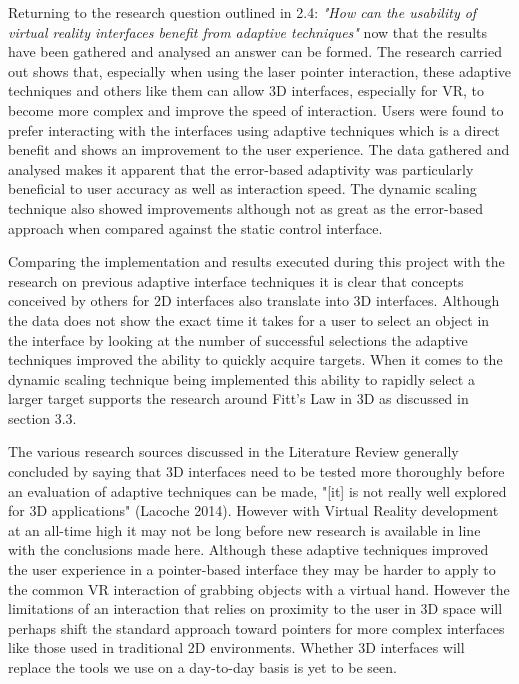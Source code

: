 \documentclass[12pt]{article}
\begin{document}
Returning to the research question outlined in 2.4: \emph{"How can the usability of virtual reality interfaces benefit from adaptive techniques"} now that the results have been gathered and analysed an answer can be formed. The research carried out shows that, especially when using the laser pointer interaction, these adaptive techniques and others like them can allow 3D interfaces, especially for VR, to become more complex and improve the speed of interaction. Users were found to prefer interacting with the interfaces using adaptive techniques which is a direct benefit and shows an improvement to the user experience. The data gathered and analysed makes it apparent that the error-based adaptivity was particularly beneficial to user accuracy as well as interaction speed. The dynamic scaling technique also showed improvements although not as great as the error-based approach when compared against the static control interface.

Comparing the implementation and results executed during this project with the research on previous adaptive interface techniques it is clear that concepts conceived by others for 2D interfaces also translate into 3D interfaces. Although the data does not show the exact time it takes for a user to select an object in the interface by looking at the number of successful selections the adaptive techniques improved the ability to quickly acquire targets. When it comes to the dynamic scaling technique being implemented this ability to rapidly select a larger target supports the research around Fitt's Law in 3D as discussed in section 3.3.

The various research sources discussed in the Literature Review generally concluded by saying that 3D interfaces need to be tested more thoroughly before an evaluation of adaptive techniques can be made, "[it] is not really well explored for 3D applications" (Lacoche 2014). However with Virtual Reality development at an all-time high it may not be long before new research is available in line with the conclusions made here. Although these adaptive techniques improved the user experience in a pointer-based interface they may be harder to apply to the common VR interaction of grabbing objects with a virtual hand. However the limitations of an interaction that relies on proximity to the user in 3D space will perhaps shift the standard approach toward pointers for more complex interfaces like those used in traditional 2D environments. Whether 3D interfaces will replace the tools we use on a day-to-day basis is yet to be seen.
\end{document}
